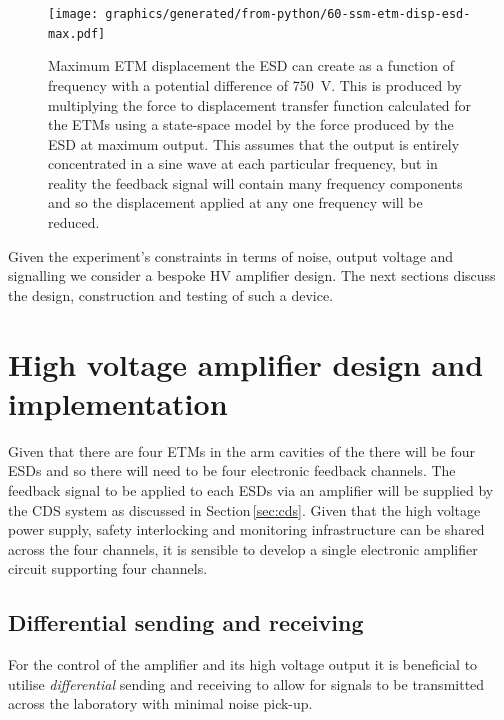\begin{figure}
  \centering
  \texttt{[image: graphics/generated/from-python/60-ssm-etm-disp-esd-max.pdf]}
  \caption[Maximum end test mass displacement the electrostatic drive can create]{\label{fig:ssm-etm-disp-esd-max}Maximum \gls{ETM} displacement the \gls{ESD} can create as a function of frequency with a potential difference of \SI{750}{\volt}. This is produced by multiplying the force to displacement transfer function calculated for the \glspl{ETM} using a state-space model by the force produced by the \gls{ESD} at maximum output. This assumes that the output is entirely concentrated in a sine wave at each particular frequency, but in reality the feedback signal will contain many frequency components and so the displacement applied at any one frequency will be reduced.}
\end{figure}

Given the experiment's constraints in terms of noise, output voltage and signalling we consider a bespoke \gls{HV} amplifier design. The next sections discuss the design, construction and testing of such a device.

\section{\label{sec:hv-amplifier}High voltage amplifier design and implementation}
Given that there are four \glspl{ETM} in the arm cavities of the \SSMEXPT{} there will be four \glspl{ESD} and so there will need to be four electronic feedback channels. The feedback signal to be applied to each \glspl{ESD} via an amplifier will be supplied by the \gls{CDS} system as discussed in Section\,\ref{sec:cds}. Given that the high voltage power supply, safety interlocking and monitoring infrastructure can be shared across the four channels, it is sensible to develop a single electronic amplifier circuit supporting four channels.

\subsection{Differential sending and receiving}
For the control of the amplifier and its high voltage output it is beneficial to utilise \emph{differential} sending and receiving to allow for signals to be transmitted across the laboratory with minimal noise pick-up.


